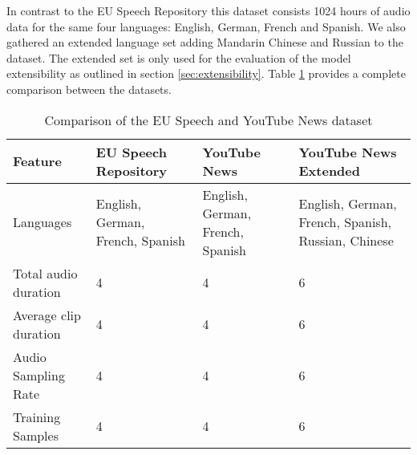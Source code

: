   	In contrast to the EU Speech Repository this dataset consists 1024 hours of audio data for the same four languages: English, German, French and Spanish. We also gathered an extended language set adding Mandarin Chinese and Russian to the dataset. The extended set is only used for the evaluation of the model extensibility as outlined in section \ref{sec:extensibility}. Table \ref{tab:dataset_comparison} provides a complete comparison between the datasets.
  	
  	
\begin{table}[]
\centering
\begin{tabularx}{\textwidth}{lXXX}
\toprule
Feature               & EU Speech Repository & YouTube News & YouTube News \mbox{Extended} \\ 
\midrule
Languages             & English, German, French, Spanish & English, German, French, Spanish & English, German, French, Spanish, Russian, Chinese \\
Total audio duration  & 4                    & 4            & 6                     \\
Average clip duration & 4                    & 4            & 6                     \\
Audio Sampling Rate   & 4                    & 4            & 6                     \\ 
Training Samples      & 4                    & 4            & 6                     \\ 
\bottomrule
\end{tabularx}
\caption{Comparison of the EU Speech and YouTube News dataset}
\label{tab:dataset_comparison}
\end{table}
	


